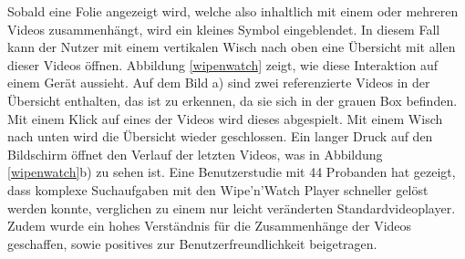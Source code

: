 \documentclass[11pt,a4paper]{report}
\begin{document}
Sobald eine Folie angezeigt wird, welche also inhaltlich mit einem oder mehreren Videos zusammenhängt, wird ein kleines Symbol eingeblendet. In diesem Fall kann der Nutzer mit einem vertikalen Wisch nach oben eine Übersicht mit allen dieser Videos öffnen. Abbildung \ref{wipenwatch} zeigt, wie diese Interaktion auf einem Gerät aussieht. Auf dem Bild a) sind zwei referenzierte Videos in der Übersicht enthalten, das ist zu erkennen, da sie sich in der grauen Box befinden. Mit einem Klick auf eines der Videos wird dieses abgespielt. Mit einem Wisch nach unten wird die Übersicht wieder geschlossen. Ein langer Druck auf den Bildschirm öffnet den Verlauf der letzten Videos, was in Abbildung \ref{wipenwatch}b) zu sehen ist. Eine Benutzerstudie mit 44 Probanden hat gezeigt, dass komplexe Suchaufgaben mit den Wipe’n’Watch Player schneller gelöst werden konnte, verglichen zu einem nur leicht veränderten Standardvideoplayer. Zudem wurde ein hohes Verständnis für die Zusammenhänge der Videos geschaffen, sowie positives zur Benutzerfreundlichkeit beigetragen. \cite{huber2010wipe}
\end{document}
